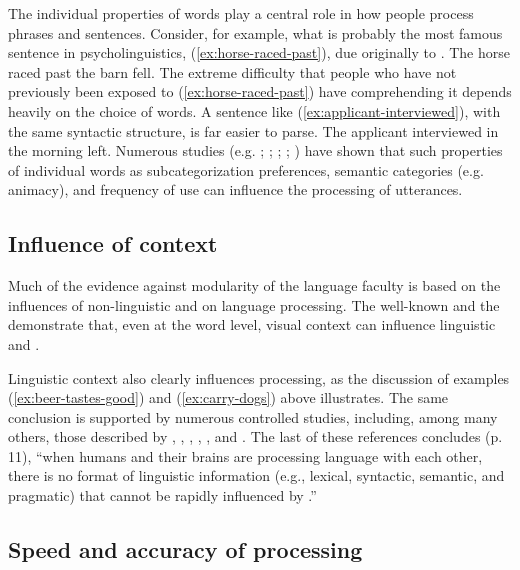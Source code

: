\documentclass[output=paper
                ,modfonts
                ,nonflat
	        ,collection
	        ,collectionchapter
	        ,collectiontoclongg
 	        ,biblatex
                ,babelshorthands
                ,newtxmath
                ,draftmode
                ,colorlinks, citecolor=brown
]{./langsci/langscibook}
\begin{document}
The individual properties of words play a central role in how people process phrases and sentences.  Consider, for example, what is probably the most famous sentence in psycholinguistics, (\ref{ex:horse-raced-past}), due originally to \citep{Bever70}.
\ea\label{ex:horse-raced-past}
The horse raced past the barn fell.
\z
The extreme difficulty that people who have not previously been exposed to (\ref{ex:horse-raced-past}) have comprehending it depends heavily on the choice of words.  A sentence like (\ref{ex:applicant-interviewed}), with the same syntactic structure, is far easier to parse.
\ea\label{ex:applicant-interviewed}
The applicant interviewed in the morning left.
\z
Numerous studies (e.g. \citealt{FordEtal82}; \citealt{TrueswellEtal93}; \citealt{MPS94a-u}; \citealt{BresnanEtal2007}; \citealt{WasowEtal2011}) have shown that such properties of individual words as subcategorization preferences, semantic categories (e.g. animacy), and frequency of use can influence the processing of utterances.  

\subsection{Influence of context}

Much of the evidence against modularity of the language faculty is based on the influences of non-linguistic  and  on language processing.  The well-known  \citep{McGurkMacDonald76} and the  \citep{Stroop35} demonstrate that, even at the word level, visual context can influence linguistic  and .

Linguistic context also clearly influences processing, as the discussion of examples (\ref{ex:beer-tastes-good}) and (\ref{ex:carry-dogs}) above illustrates.  The same conclusion is supported by numerous controlled studies, including,
among many others, those described by \citet{CS85a}, \citet{AltmannSteedman88}, \citet{Branigan2007}, \citet{Tooley2007a}, \citet{MatsukiEtal2011}, and \citet{SpevackEtal2018}.  The last of these references concludes (p.\,11), ``when humans and their brains are processing language with each other, there is no format of linguistic information (e.g., lexical, syntactic, semantic, and pragmatic) that cannot be rapidly
influenced by .''

\subsection{Speed and accuracy of processing}
\end{document}
